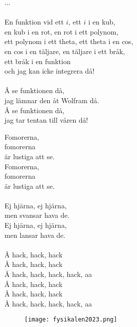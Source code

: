\documentclass[a6paper, 10pt, twoside]{article}
\begin{document}
\begin{lyrics}
...\\
\vspace{1pt}\\
En funktion vid ett $i$, ett $i$ i en kub, \\
en kub i en rot, en rot i ett polynom, \\
ett polynom i ett theta, ett theta i en cos, \\
en cos i en täljare, en täljare i ett bråk, \\
ett bråk i en funktion \\
och jag kan icke integrera då! \\
\vspace{2pt}\\
Å se funktionen då, \\
jag lämnar den åt Wolfram då. \\
Å se funktionen då, \\
jag tar tentan till våren då! 

\end{lyrics}


\begin{center}
\end{center}
\begin{lyrics}
Fomorerna, \\
fomorerna \\
är lustiga att se. \\
Fomorerna, \\
fomorerna \\
är lustiga att se.\\
\vspace{1pt}\\
Ej hjärna, ej hjärna, \\
men svansar hava de. \\
Ej hjärna, ej hjärna, \\
men lansar hava de. \\
\vspace{1pt}\\
Å hack, hack, hack \\
Å hack, hack, hack \\
Å hack, hack, hack, hack, aa \\
Å hack, hack, hack \\
Å hack, hack, hack \\
Å hack, hack, hack, hack, aa
\end{lyrics}

\begin{figure}[!h]
\hspace{150pt}
\texttt{[image: fysikalen2023.png]}
\end{figure}
\end{document}

